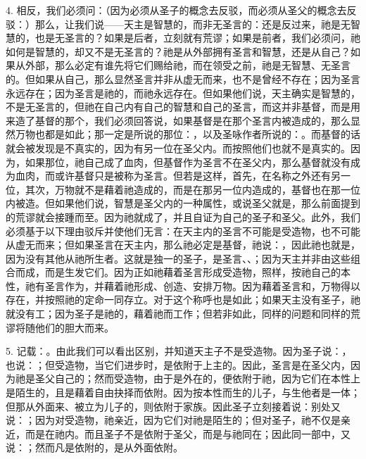 4. 相反，我们必须问：（因为必须从圣子的概念去反驳，而必须从圣父的概念去反驳：）那么，让我们说——天主是智慧的，而非无圣言的：还是反过来，祂是无智慧的，也是无圣言的？如果是后者，立刻就有荒谬；如果是前者，我们必须问，祂如何是智慧的，却又不是无圣言的？祂是从外部拥有圣言和智慧，还是从自己？如果从外部，那么必定有谁先将它们赐给祂，而在领受之前，祂是无智慧、无圣言的。但如果从自己，那么显然圣言并非从虚无而来，也不是曾经不存在；因为圣言永远存在；因为圣言是祂的，而祂永远存在。但如果他们说，天主确实是智慧的，不是无圣言的，但祂在自己内有自己的智慧和自己的圣言，而这并非基督，而是用来造了基督的那个，我们必须回答说，如果基督是在那个圣言内被造成的，那么显然万物也都是如此；那一定是所说的那位：，以及圣咏作者所说的：。而基督的话就会被发现是不真实的，因为有另一位在圣父内。而按照他们也就不是真实的。因为，如果那位，祂自己成了血肉，但基督作为圣言不在圣父内，那么基督就没有成为血肉，而或许基督只是被称为圣言。但若是这样，首先，在名称之外还有另一位，其次，万物就不是藉着祂造成的，而是在那另一位内造成的，基督也在那一位内被造。但如果他们说，智慧是圣父内的一种属性，或说圣父就是，那么前面提到的荒谬就会接踵而至。因为祂就成了，并且自证为自己的圣子和圣父。此外，我们必须基于以下理由驳斥并使他们无言：在天主内的圣言不可能是受造物，也不可能从虚无而来；但如果圣言在天主内，那么祂必定是基督，祂说：，因此祂也就是，因为没有其他从祂所生者。这就是独一的圣子，是圣言、、；因为天主并非由这些组合而成，而是生发它们。因为正如祂藉着圣言形成受造物，照样，按祂自己的本性，祂有圣言作为，并藉着祂形成、创造、安排万物。因为藉着圣言和，万物得以存在，并按照祂的定命一同存立。对于这个称呼也是如此；如果天主没有圣子，祂就没有工；因为圣子是祂的，藉着祂而工作；但若非如此，同样的问题和同样的荒谬将随他们的胆大而来。\par

5. 记载：。由此我们可以看出区别，并知道天主子不是受造物。因为圣子说：，也说：；但受造物，当它们进步时，是依附于上主的。因此，圣言是在圣父内，因为祂是圣父自己的；然而受造物，由于是外在的，便依附于祂，因为它们在本性上是陌生的，且是藉着自由抉择而依附。因为按本性而生的儿子，与生他者是一体；但那从外面来、被立为儿子的，则依附于家族。因此圣子立刻接着说：别处又说：；因为对受造物，祂亲近，因为它们对祂是陌生的；但对圣子，祂不仅是亲近，而是在祂内。而且圣子不是依附于圣父，而是与祂同在；因此同一部中，又说：；然而凡是依附的，是从外面依附。\par

